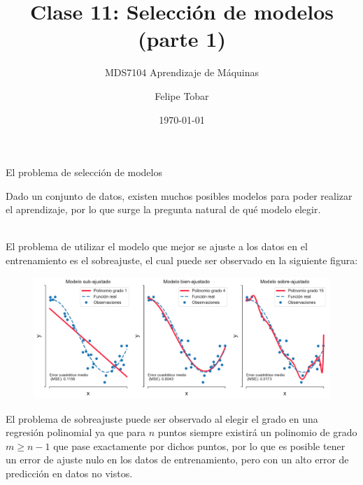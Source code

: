 \documentclass[9pt, handout]{beamer}
\title{Clase 11: Selección de modelos (parte 1)}
\subtitle{MDS7104 Aprendizaje de Máquinas}
\date{\today}
\author{Felipe Tobar}
\institute{Iniciativa de Datos e Inteligencia Artificial\\Universidad de Chile}
\begin{document}
\begin{frame}
  \titlepage
\end{frame}

\begin{frame}{El problema de selección de modelos}

Dado un conjunto de datos, existen muchos posibles modelos para poder realizar el aprendizaje, por lo que surge la pregunta natural de qué modelo elegir. \\~\ \pause

El problema de utilizar el modelo que mejor se ajuste a los datos en el entrenamiento es el sobreajuste, el cual puede ser observado en la siguiente figura:
\begin{figure}[h!]
    \centering
    \includegraphics[width = 0.8\linewidth]{../img/cap4_ajuste.pdf}
\end{figure}\pause

El problema de sobreajuste puede ser observado al elegir el grado en una regresión polinomial ya que para $n$ puntos siempre existirá un polinomio de grado $m \geq n -1$ que pase exactamente por dichos puntos, por lo que es posible tener un error de ajuste nulo en los datos de entrenamiento, pero con un alto error de predicción en datos no vistos.

\end{frame}
\end{document}
